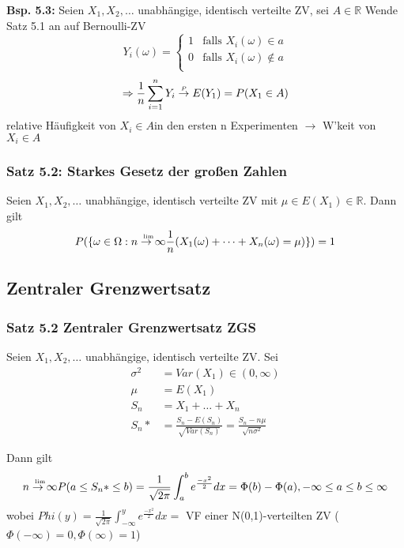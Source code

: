 \documentclass[a4paper,11pt]{article}
\begin{document}
\vspace{6pt}
\noindent\textbf{Bsp. 5.3:}
Seien $X_1,X_2,\dots$ unabhängige, identisch verteilte ZV, sei $A\in\mathbb{R}$
Wende Satz 5.1 an auf Bernoulli-ZV
\begin{equation*}
Y_i(\omega)=\begin{cases}
1 &\text{falls }X_i(\omega)\in a \\
0 &\text{falls }X_i(\omega)\notin a\\
\end{cases}
\end{equation*}
\[\Rightarrow \frac{1}{n}\sum_{i=1}^{n}Y_i\overset{\mathclap{\scriptscriptstyle P}}{\rightarrow} E(Y_1) = P(X_1\in A)\]
relative Häufigkeit von \glqq$X_i\in A$\grqq in den ersten n Experimenten $\rightarrow$ W'keit von \glqq$X_i\in A$\grqq

\subsubsection{Satz 5.2: Starkes Gesetz der großen Zahlen}
Seien $X_1,X_2,\dots$ unabhängige, identisch verteilte ZV mit $\mu\in E(X_1)\in\mathbb{R}$. Dann gilt
\[P(\{\omega\in\Omega:\overset{\mathclap{\scriptscriptstyle \text{lim}}}{n\rightarrow\infty}\frac{1}{n}(X_1(\omega)+\dots+X_n(\omega)=\mu)\})=1\]

\subsection{Zentraler Grenzwertsatz}
\subsubsection{Satz 5.2 Zentraler Grenzwertsatz ZGS}
Seien $X_1,X_2,\dots$ unabhängige, identisch verteilte ZV. Sei
\begin{align*}
\sigma^2 &= Var(X_1)\in(0,\infty)\\
\mu &= E(X_1)\\ 
S_n &= X_1+\dots+X_n\\
S_n* &= \frac{S_n-E(S_n)}{\sqrt{Var(S_n)}} = \frac{S_n-n\mu}{\sqrt{n\sigma^2}}
\end{align*}



Dann gilt 
\[\overset{\mathclap{\scriptscriptstyle \text{lim}}}{n\rightarrow\infty}P(a\leq S_n*\leq b) = \frac{1}{\sqrt{2\pi}}\int_{a}^{b}e^\frac{-x^2}{2}dx = \Phi(b) - \Phi(a), -\infty\leq a\leq b\leq\infty\]
wobei $Phi(y)=\frac{1}{\sqrt{2\pi}}\int_{-\infty}^{y}e^\frac{-x^2}{2}dx = $ VF einer N(0,1)-verteilten ZV ($\Phi(-\infty)=0,\Phi(\infty)=1$)
\end{document}
